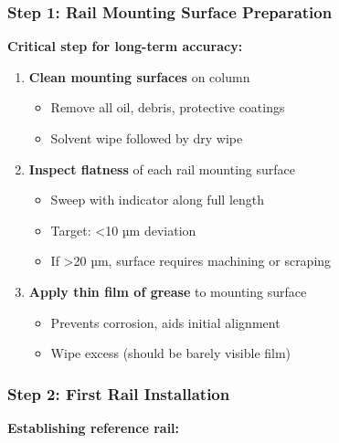 \documentclass[
]{article}
\providecommand{\tightlist}{%
  \setlength{\itemsep}{0pt}\setlength{\parskip}{0pt}}
\begin{document}
\subsubsection{Step 1: Rail Mounting Surface
Preparation}\label{step-1-rail-mounting-surface-preparation}

\textbf{Critical step for long-term accuracy:}

\begin{enumerate}
\def\labelenumi{\arabic{enumi}.}
\tightlist
\item
  \textbf{Clean mounting surfaces} on column

  \begin{itemize}
  \tightlist
  \item
    Remove all oil, debris, protective coatings
  \item
    Solvent wipe followed by dry wipe
  \end{itemize}
\item
  \textbf{Inspect flatness} of each rail mounting surface

  \begin{itemize}
  \tightlist
  \item
    Sweep with indicator along full length
  \item
    Target: \textless10 µm deviation
  \item
    If \textgreater20 µm, surface requires machining or scraping
  \end{itemize}
\item
  \textbf{Apply thin film of grease} to mounting surface

  \begin{itemize}
  \tightlist
  \item
    Prevents corrosion, aids initial alignment
  \item
    Wipe excess (should be barely visible film)
  \end{itemize}
\end{enumerate}

\subsubsection{Step 2: First Rail
Installation}\label{step-2-first-rail-installation}

\textbf{Establishing reference rail:}
\end{document}
